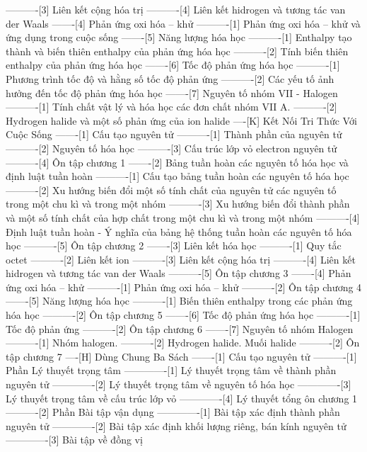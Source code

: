 ----------[3] Liên kết cộng hóa trị
----------[4] Liên kết hidrogen và tương tác van der Waals
-------[4] Phản ứng oxi hóa – khử
----------[1] Phản ứng oxi hóa – khử và ứng dụng trong cuộc sống
-------[5] Năng lượng hóa học
----------[1] Enthalpy tạo thành và biến thiên enthalpy của phản ứng hóa học
----------[2] Tính biến thiên enthalpy của phản ứng hóa học
-------[6] Tốc độ phản ứng hóa học
----------[1] Phương trình tốc độ và hằng số tốc độ phản ứng
----------[2] Các yếu tố ảnh hưởng đến tốc độ phản ứng hóa học
-------[7] Nguyên tố nhóm VII - Halogen
----------[1] Tính chất vật lý và hóa học các đơn chất nhóm VII A.
----------[2] Hydrogen halide và một số phản ứng của ion halide
----[K] Kết Nối Tri Thức Với Cuộc Sống
-------[1] Cấu tạo nguyên tử
----------[1] Thành phần của nguyên tử
----------[2] Nguyên tố hóa học
----------[3] Cấu trúc lớp vỏ electron nguyên tử
----------[4] Ôn tập chương 1
-------[2] Bảng tuần hoàn các nguyên tố hóa học và định luật tuần hoàn
----------[1] Cấu tạo bảng tuần hoàn các nguyên tố hóa học
----------[2] Xu hướng biến đổi một số tính chất của nguyên tử các nguyên tố trong một chu kì và trong một nhóm
----------[3] Xu hướng biến đổi thành phần và một số tính chất của hợp chất trong một chu kì và trong một nhóm
----------[4] Định luật tuần hoàn - Ý nghĩa của bảng hệ thống tuần hoàn các nguyên tố hóa học
----------[5] Ôn tập chương 2
-------[3] Liên kết hóa học
----------[1] Quy tắc octet
----------[2] Liên kết ion
----------[3] Liên kết cộng hóa trị
----------[4] Liên kết hidrogen và tương tác van der Waals
----------[5] Ôn tập chương 3
-------[4] Phản ứng oxi hóa – khử
----------[1] Phản ứng oxi hóa – khử 
----------[2] Ôn tập chương 4
-------[5] Năng lượng hóa học
----------[1] Biến thiên enthalpy trong các phản ứng hóa học
----------[2] Ôn tập chương 5
-------[6] Tốc độ phản ứng hóa học
----------[1] Tốc độ phản ứng
----------[2] Ôn tập chương 6
-------[7] Nguyên tố nhóm Halogen
----------[1] Nhóm halogen.
----------[2] Hydrogen halide. Muối halide
----------[2] Ôn tập chương 7
----[H] Dùng Chung Ba Sách
-------[1] Cấu tạo nguyên tử
----------[1] Phần Lý thuyết trọng tâm
-------------[1] Lý thuyết trọng tâm về thành phần nguyên tử
-------------[2] Lý thuyết trọng tâm về nguyên tố hóa học
-------------[3] Lý thuyết trọng tâm về cấu trúc lớp vỏ
-------------[4] Lý thuyết tổng ôn chương 1
----------[2] Phần Bài tập vận dụng
-------------[1] Bài tập xác định thành phần nguyên tử
-------------[2] Bài tập xác định khối lượng riêng, bán kính nguyên tử
-------------[3] Bài tập về đồng vị
